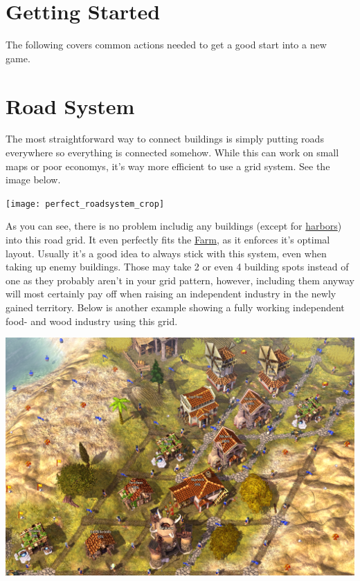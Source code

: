 \documentclass[12pt]{article}
\begin{document}
\section{Getting Started}
\label{sec:gettingstarted}

The following covers common actions needed to get a good start into a new game.

\section{Road System}
\label{sec:roadsystem}

The most straightforward way to connect buildings is simply putting roads everywhere so everything is connected somehow. While this can work on small maps or poor economys, it's way more efficient to use a grid system. See the image below.

\vspace{12pt}
\texttt{[image: perfect\_roadsystem\_crop]}
\vspace{0pt}

As you can see, there is no problem includig any buildings (except for \hyperref[sec:harbor]{harbors}) into this road grid. It even perfectly fits the \hyperref[sec:farm]{Farm}, as it enforces it's optimal layout. Usually it's a good idea to always stick with this system, even when taking up enemy buildings. Those may take 2 or even 4 building spots instead of one as they probably aren't in your grid pattern, however, including them anyway will most certainly pay off when raising an independent industry in the newly gained territory. Below is another example showing a fully working independent food- and wood industry using this grid.

\vspace{12pt}
\includegraphics[width=\textwidth]{roadsystem_in_use_crop}
\end{document}

